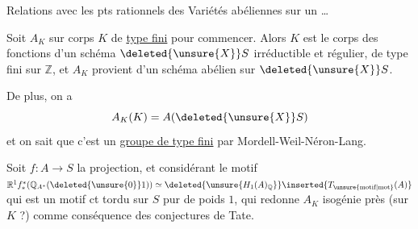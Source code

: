 Relations avec les pts  rationnels  des %
Variétés abéliennes sur un   \ldots %

Soit $A_K$  sur corps $K$ de \uline{type fini} %
pour commencer. Alors $K$ est le corps des %
fonctions d'un schéma $\deleted{\unsure{X}}S$ irréductible et %
régulier, de type fini sur $\mathbb{Z}$, et  $A_K$ %
provient d'un schéma abélien sur $\deleted{\unsure{X}}S$. %

De plus, on a %
\[
 A_K(K)=A(\deleted{\unsure{X}}S) %
\]
et on sait que c'est un \uline{groupe de type %
fini} par Mordell-Weil-Néron-Lang. %

Soit $f:A\longrightarrow S$ la projection, et %
considérant le motif $\mathbb{R}^1 f^{*}_*(\mathbb{Q}_{A^*}(\deleted{\unsure{0}}1))\simeq
\deleted{\unsure{H_1(A)_{\mathbb{Q}}}} \inserted{T_{\text{\unsure{motif|mot}}}(A)}$ %
qui est un motif ct tordu sur $S$  %
pur de poids $1$, qui redonne $A_K$ %
 isogénie près   (sur $K$ ?) comme %
conséquence des conjectures de Tate. %
